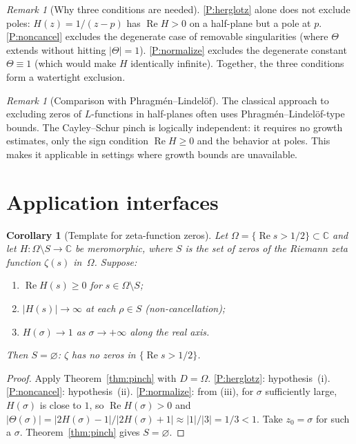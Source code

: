 \documentclass[11pt]{amsart}
\newtheorem{corollary}[theorem]{Corollary}
\theoremstyle{definition}
\theoremstyle{remark}
\newtheorem{remark}[theorem]{Remark}
\newcommand{\C}{\mathbb{C}}
\DeclareMathOperator{\re}{Re}
\begin{document}
\begin{remark}[Why three conditions are needed]\label{rem:three}
\ref{P:herglotz} alone does not exclude poles:
$H(z)=1/(z-p)$ has $\re H>0$ on a half-plane but a pole at $p$.
\ref{P:noncancel} excludes the degenerate case of removable singularities
(where $\Theta$ extends without hitting $|\Theta|=1$).
\ref{P:normalize} excludes the degenerate constant
$\Theta\equiv 1$ (which would make $H$ identically infinite).
Together, the three conditions form a watertight exclusion.
\end{remark}

\begin{remark}[Comparison with Phragm\'en--Lindel\"of]
The classical approach to excluding zeros of $L$-functions in half-planes
often uses Phragm\'en--Lindel\"of-type bounds.
The Cayley--Schur pinch is logically independent: it requires no
growth estimates, only the sign condition $\re H\ge0$ and the behavior
at poles.  This makes it applicable in settings where growth bounds are
unavailable.
\end{remark}

\section{Application interfaces}\label{sec:apps}

\begin{corollary}[Template for zeta-function zeros]\label{cor:rh}
Let $\Omega=\{\re s>1/2\}\subset\C$ and let $H:\Omega\setminus S\to\C$
be meromorphic, where $S$ is the set of zeros of the Riemann zeta
function $\zeta(s)$ in~$\Omega$.  Suppose:
\begin{enumerate}[label=\textup{(\roman*)},nosep]
\item $\re H(s)\ge 0$ for $s\in\Omega\setminus S$;
\item $|H(s)|\to\infty$ at each $\rho\in S$ (non-cancellation);
\item $H(\sigma)\to 1$ as $\sigma\to+\infty$ along the real axis.
\end{enumerate}
Then $S=\varnothing$: $\zeta$ has no zeros in $\{\re s>1/2\}$.
\end{corollary}
\begin{proof}
Apply Theorem~\ref{thm:pinch} with $D=\Omega$.
\ref{P:herglotz}: hypothesis~(i).
\ref{P:noncancel}: hypothesis~(ii).
\ref{P:normalize}: from (iii), for $\sigma$ sufficiently large,
$H(\sigma)$ is close to $1$, so $\re H(\sigma)>0$ and
$|\Theta(\sigma)|=|2H(\sigma)-1|/|2H(\sigma)+1|\approx|1|/|3|=1/3<1$.
Take $z_0=\sigma$ for such a $\sigma$.
Theorem~\ref{thm:pinch} gives $S=\varnothing$.
\end{proof}
\end{document}
